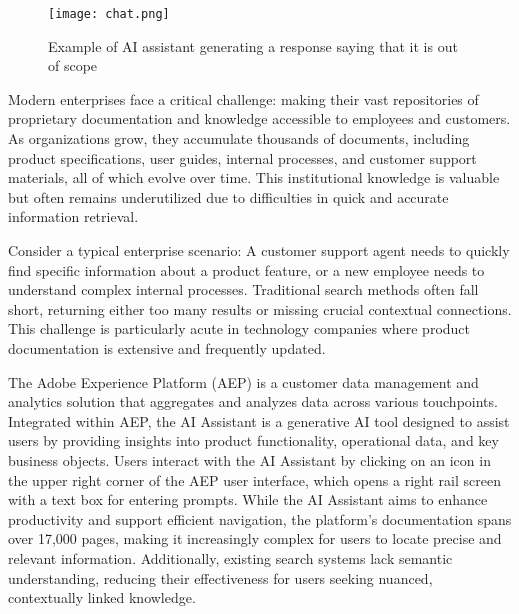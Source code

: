 \begin{figure}[h]
    
    \texttt{[image: chat.png]} 
    \caption{Example of AI assistant generating a response saying that it is out of scope}
     \vspace{-1.5em}
    \label{fig:chat}
    
\end{figure}

Modern enterprises face a critical challenge: making their vast repositories of proprietary documentation and knowledge accessible to employees and customers. As organizations grow, they accumulate thousands of documents, including product specifications, user guides, internal processes, and customer support materials, all of which evolve over time. This institutional knowledge is valuable but often remains underutilized due to difficulties in quick and accurate information retrieval.





Consider a typical enterprise scenario: A customer support agent needs to quickly find specific information about a product feature, or a new employee needs to understand complex internal processes. Traditional search methods often fall short, returning either too many results or missing crucial contextual connections. This challenge is particularly acute in technology companies where product documentation is extensive and frequently updated.


The Adobe Experience Platform (AEP) is a customer data management and analytics solution that aggregates and analyzes data across various touchpoints. Integrated within AEP, the AI Assistant is a generative AI tool designed to assist users by providing insights into product functionality, operational data, and key business objects. Users interact with the AI Assistant by clicking on an icon in the upper right corner of the AEP user interface, which opens a right rail screen with a text box for entering prompts. While the AI Assistant aims to enhance productivity and support efficient navigation, the platform’s documentation spans over 17,000 pages, making it increasingly complex for users to locate precise and relevant information. Additionally, existing search systems lack semantic understanding, reducing their effectiveness for users seeking nuanced, contextually linked knowledge.


